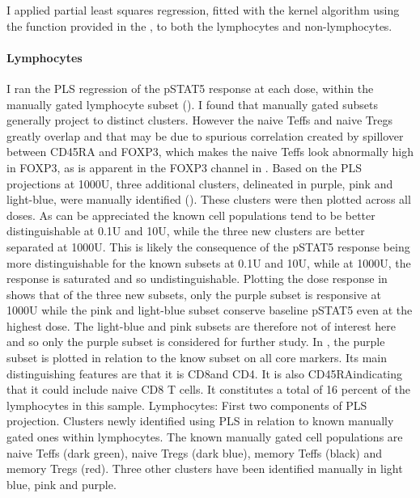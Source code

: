 I applied partial least squares regression, fitted with the kernel algorithm using the  function provided in the ,
to both the lymphocytes and non-lymphocytes.
%

\paragraph{Lymphocytes} 
I ran the PLS regression of the pSTAT5 response at each dose, within the manually gated lymphocyte subset ().
I found that manually gated subsets generally project to distinct clusters.
However the naive Teffs and naive Tregs greatly overlap and that may be due to spurious correlation created by
spillover between CD45RA and FOXP3, which makes the naive Teffs look abnormally high in FOXP3,
as is apparent in the FOXP3 channel in .
Based on the \gls{PLS} projections at 1000U, three additional clusters, delineated in purple, pink and light-blue, were manually identified
().  These clusters were then plotted across all doses.
As can be appreciated the known cell populations tend to be better distinguishable at 0.1U and 10U,
while the three new clusters are better separated at 1000U.  This is likely the consequence of the pSTAT5 response being more distinguishable
for the known subsets at 0.1U and 10U, while at 1000U, the response is saturated and so undistinguishable.
Plotting the dose response in  shows that of the three new subsets, only the purple subset is
responsive at 1000U while the pink and light-blue subset conserve baseline pSTAT5 even at the highest dose.
The light-blue and pink subsets are therefore not of interest here and so only the purple subset is considered for further study.
In , the purple subset is plotted in relation to the know subset on all core markers.
Its main distinguishing features are that it is CD8\positive and CD4\negative.
It is also CD45RA\positive indicating that it could include naive CD8 T cells.
It constitutes a total of 16 percent of the lymphocytes in this sample.
{ Lymphocytes: First two components of \gls{PLS} projection.  Clusters newly identified using \gls{PLS} in relation to known manually gated ones within lymphocytes. }
{
The known manually gated cell populations are naive Teffs (dark green), naive Tregs (dark blue), memory Teffs (black) and memory Tregs (red).
Three other clusters have been identified manually in light blue, pink and purple.
}

